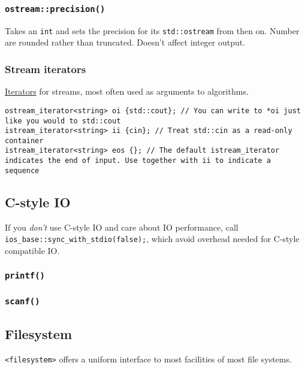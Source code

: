 \documentclass[8pt, table, xcdraw]{article}%
\begin{document}
\subsubsection{\lstinline{ostream::precision()}} \label{precision}

Takes an \lstinline{int} and sets the precision for its \lstinline{std::ostream} from then on. Number are rounded rather than truncated. Doesn't affect integer output.

\subsubsection{Stream iterators} \label{stream_iterators}

\hyperref[iterators]{Iterators} for streams, most often used as arguments to algorithms.

\begin{lstlisting}
ostream_iterator<string> oi {std::cout}; // You can write to *oi just like you would to std::cout
istream_iterator<string> ii {cin}; // Treat std::cin as a read-only container
istream_iterator<string> eos {}; // The default istream_iterator indicates the end of input. Use together with ii to indicate a sequence
\end{lstlisting}

\subsection{C-style IO}

If you \textit{don't} use C-style IO and care about IO performance, call \lstinline{ios_base::sync_with_stdio(false);}, which avoid overhead needed for C-style compatible IO.

\subsubsection{\lstinline{printf()}}

\subsubsection{\lstinline{scanf()}}

\subsection{Filesystem}

\lstinline{<filesystem>} offers a uniform interface to most facilities of most file systems.
\end{document}
